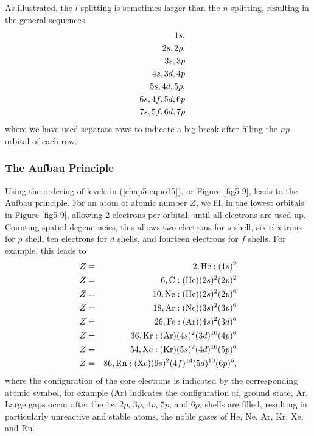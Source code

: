 As illustrated, the $l$-splitting is sometimes larger than the $n$ 
splitting, resulting in the general sequences
\begin{eqnarray}
&& 1s,\cr
&& 2s,2p,\cr
&& 3s,3p\cr
&& 4s,3d,4p\cr
&& 5s,4d,5p,\cr
&& 6s,4f,5d,6p\cr
&& 7s,5f,6d,7p
\label{chap5-eqno15}
\end{eqnarray}
where we have used separate rows to indicate a big break after 
filling the $np$ orbital of each row.

\subsubsection{The Aufbau Principle}

Using the ordering of levels in (\ref{chap5-eqno15}), or Figure
\ref{fig5-9}, leads to the Aufbau principle. For an atom of atomic
number $Z$, we fill in the lowest orbitals in Figure \ref{fig5-9},
allowing 2 electrons per orbital, until all electrons are used
up. Counting spatial degeneracies, this allows two electrons for $s$
shell, six electrons for $p$ shell, ten electrons for $d$ shells, and
fourteen electrons for $f$ shells.  For example, this leads to
\begin{eqnarray}
Z &=& 2, {\rm He} : (1s)^2\cr
Z &=& 6, {\rm C} : ( {\rm He} )   (2s)^2 (2p)^2\cr
Z &=& 10, {\rm Ne} : ( {\rm He} ) (2s)^2 (2p)^6\cr
Z &=& 18, {\rm Ar} : ( {\rm Ne} ) (3s)^2 (3p)^6\cr
Z &=& 26, {\rm Fe} : ( {\rm Ar} ) (4s)^2 (3d)^6\cr
Z &=& 36, {\rm Kr} : ( {\rm Ar} ) (4s)^2 (3d)^{10} (4p)^6\cr
Z &=& 54, {\rm Xe} : ( {\rm Kr} ) (5s)^2 (4d)^{10} (5p)^6\cr
Z &=& 86, {\rm Rn} : ( {\rm Xe} ) (6s)^2 (4f)^{14} (5d)^{10} (6p)^6,
\end{eqnarray}
where the configuration of the core electrons is indicated by the 
corresponding atomic symbol, for example (Ar) indicates the configuration 
of, ground state, Ar.  Large gaps occur after the $1s$, $2p$, $3p$, 
$4p$, $5p$, and $6p$, shells are filled, resulting in particularly unreactive 
and stable atoms, the noble gases of He, Ne, Ar, Kr, Xe, and Rn.

